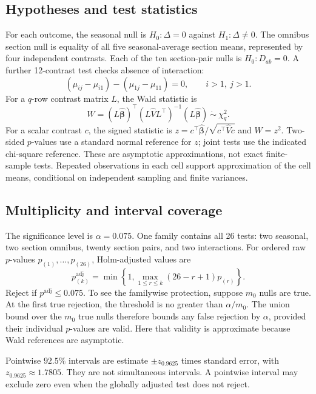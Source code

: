 \subsection{Hypotheses and test statistics}
For each outcome, the seasonal null is $H_0:\Delta=0$ against $H_1:\Delta\ne0$. The omnibus section null is equality of all five seasonal-average section means, represented by four independent contrasts. Each of the ten section-pair nulls is $H_0:D_{ab}=0$. A further 12-contrast test checks absence of interaction:
\begin{equation}
(\mu_{ij}-\mu_{i1})-(\mu_{1j}-\mu_{11})=0,
\qquad i>1,\ j>1.
\end{equation}
For a $q$-row contrast matrix $L$, the Wald statistic is
\begin{equation}
W=(L\widehat{\boldsymbol\beta})^\top
 (L\widehat V L^\top)^{-1}
 (L\widehat{\boldsymbol\beta})\ \dot\sim\ \chi_q^2.
\end{equation}
For a scalar contrast $c$, the signed statistic is
$z=c^\top\widehat{\boldsymbol\beta}/\sqrt{c^\top\widehat Vc}$ and $W=z^2$. Two-sided $p$-values use a standard normal reference for $z$; joint tests use the indicated chi-square reference. These are asymptotic approximations, not exact finite-sample tests. Repeated observations in each cell support approximation of the cell means, conditional on independent sampling and finite variances.

\subsection{Multiplicity and interval coverage}
The significance level is $\alpha=0.075$. One family contains all 26 tests: two seasonal, two section omnibus, twenty section pairs, and two interactions. For ordered raw $p$-values $p_{(1)},\ldots,p_{(26)}$, Holm-adjusted values are
\begin{equation}
p^{\mathrm{adj}}_{(k)}=
\min\left\{1,\max_{1\le r\le k}(26-r+1)p_{(r)}\right\}.
\end{equation}
Reject if $p^{\mathrm{adj}}\le0.075$. To see the familywise protection, suppose $m_0$ nulls are true. At the first true rejection, the threshold is no greater than $\alpha/m_0$. The union bound over the $m_0$ true nulls therefore bounds any false rejection by $\alpha$, provided their individual $p$-values are valid. Here that validity is approximate because Wald references are asymptotic.

Pointwise $92.5\%$ intervals are estimate $\pm z_{0.9625}$ times standard error, with $z_{0.9625}\approx1.7805$. They are not simultaneous intervals. A pointwise interval may exclude zero even when the globally adjusted test does not reject.

